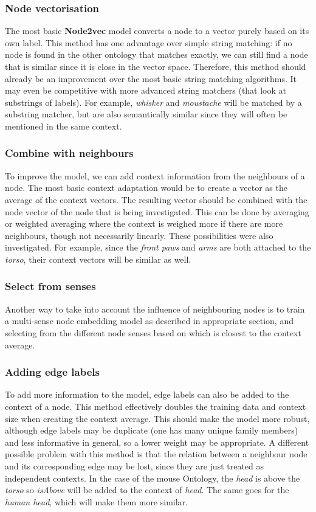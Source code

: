 \documentclass{article}
\begin{document}
  \subsubsection{Node vectorisation}
  The most basic \textbf{Node2vec} model converts a node to a vector purely based on its own label. This method has one advantage over simple string matching: if no node is found in the other ontology that matches exactly, we can still find a node that is similar since it is close in the vector space. Therefore, this method should already be an improvement over the most basic string matching algorithms. It may even be competitive with more advanced string matchers (that look at substrings of labels). For example, \emph{whisker} and \emph{moustache} will be matched by a substring matcher, but are also semantically similar since they will often be mentioned in the same context.
  \subsubsection{Combine with neighbours}
  To improve the model, we can add context information from the neighbours of a node. The most basic context adaptation would be to create a vector as the average of the context vectors. The resulting vector should be combined with the node vector of the node that is being investigated. This can be done by averaging or weighted averaging where the context is weighed more if there are more neighbours, though not necessarily linearly. These possibilities were also investigated.
  For example, since the \emph{front paws} and \emph{arms} are both attached to the \emph{torso}, their context vectors will be similar as well.
  \subsubsection{Select from senses}
  Another way to take into account the influence of neighbouring nodes is to train a multi-sense node embedding model as described in {appropriate section}, and selecting from the different node senses based on which is closest to the context average. %
  \subsubsection{Adding edge labels}
  To add more information to the model, edge labels can also be added to the context of a node. This method effectively doubles the training data and context size when creating the context average. This should make the model more robust, although edge labels may be duplicate (one has many unique family members) and less informative in general, so a lower weight may be appropriate. A different possible problem with this method is that the relation between a neighbour node and its corresponding edge may be lost, since they are just treated as independent contexts.
  In the case of the mouse Ontology, the \emph{head} is above the \emph{torso} so \emph{isAbove} will be added to the context of \emph{head}. The same goes for the \emph{human head}, which will make them more similar.
\end{document}
